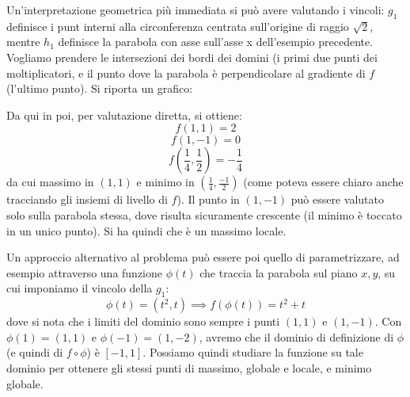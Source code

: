 \documentclass[a4paper,11pt]{article}
\begin{document}
\begin{enumerate}
Un'interpretazione geometrica più immediata si può avere valutando i vincoli: $g_1$ definisce i punt interni alla circonferenza centrata sull'origine di raggio $\sqrt{2}$, mentre $h_1$ definisce la parabola con asse sull'asse x dell'esempio precedente.
Vogliamo prendere le intersezioni dei bordi dei domini (i primi due punti dei moltiplicatori, e il punto dove la parabola è perpendicolare al gradiente di $f$ (l'ultimo punto).
Si riporta un grafico:
\begin{center}

\end{center}
Da qui in poi, per valutazione diretta, si ottiene:
$$
f(1,1) = 2
$$
$$
f(1, -1) = 0
$$
$$
f\left(\frac{1}{4}, \frac{1}{2} \right) = -\frac{1}{4}
$$
da cui massimo in $(1,1)$ e minimo in $(\frac{1}{4}, \frac{-1}{2})$ (come poteva essere chiaro anche tracciando gli insiemi di livello di $f$).
Il punto in $(1, -1)$ può essere valutato solo sulla parabola stessa, dove risulta sicuramente crescente (il minimo è toccato in un unico punto).
Si ha quindi che è un massimo locale.

Un approccio alternativo al problema può essere poi quello di parametrizzare, ad esempio attraverso una funzione $\phi(t)$ che traccia la parabola sul piano $x,y$, su cui imponiamo il vincolo della $g_1$:
$$
\phi(t) = (t^2, t) \implies f(\phi(t)) = t^2 + t
$$
dove si nota che i limiti del dominio sono sempre i punti $(1,1)$ e $(1, -1)$.
Con $\phi(1) = (1,1)$ e $\phi(-1) = (1, -2)$, avremo che il dominio di definizione di $\phi$ (e quindi di $f \circ \phi$) è $[-1, 1]$.
Possiamo quindi studiare la funzione su tale dominio per ottenere gli stessi punti di massimo, globale e locale, e minimo globale.


\end{enumerate}
\end{document}
